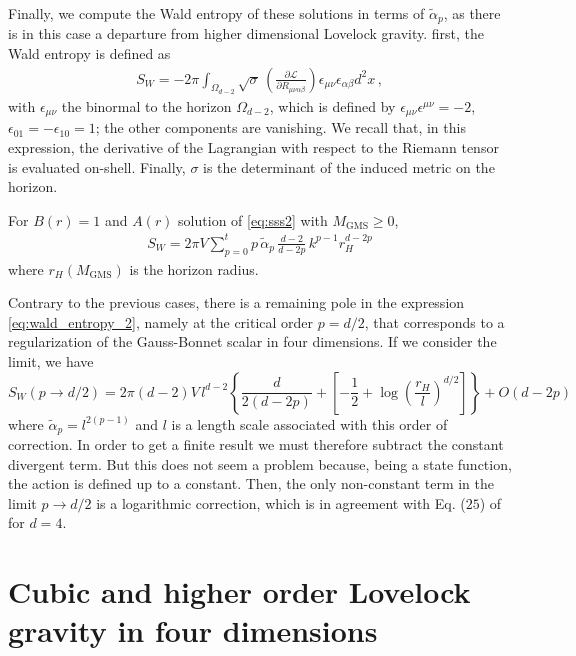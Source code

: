 \documentclass[aps,prd,preprint,nofootinbib]{revtex4-1}
\begin{document}
Finally, we compute the Wald entropy of these solutions in terms of $\tilde{\alpha}_p$, as there is in this case a departure from higher dimensional Lovelock gravity. first, the Wald entropy is defined as 
\begin{eqnarray}
 S_{W}=-2\pi \int_{\Omega_{d-2}} \sqrt{\sigma} \, \left( \frac{\partial \mathcal{L}}{\partial R_{\mu\nu\alpha\beta}} \right) \epsilon_{\mu\nu} \epsilon_{\alpha\beta} d^2 x \,,
\end{eqnarray}
with $\epsilon_{\mu\nu}$ the binormal to the horizon $\Omega_{d-2}$, which is defined by $\epsilon_{\mu\nu} \epsilon^{\mu\nu} =-2$, $\epsilon_{01}=-\epsilon_{10}=1$; the other components are vanishing. We recall that, in this expression, the derivative of the Lagrangian with respect to the Riemann tensor  is evaluated on-shell. Finally, $\sigma$ is the determinant of the induced metric on the horizon. 

For $B(r)=1$ and $A\left(r\right)$ solution of \eqref{eq:sss2} with $M_{\text{GMS}} \geq 0$,
\begin{eqnarray}
S_W=2 \pi V  \sum_{p=0}^t p \,  \tilde{\alpha}_p \, \frac{d-2}{d-2p} \, k^{p-1} r_H^{d-2p}\label{eq:wald_entropy_2}
\end{eqnarray}
where $r_H \left(M_{\text{GMS}} \right)$ is the horizon radius. 

Contrary to the previous cases, there is a remaining pole in the expression \eqref{eq:wald_entropy_2}, namely at the critical order $p=d/2$, that corresponds to a regularization of the Gauss-Bonnet scalar in four dimensions. If we consider the limit, we have 
\begin{equation}
S_W \left( p \to d/2 \right) =2\pi(d-2) V \, l^{d-2}  \left\lbrace \frac{d  }{2(d-2p)} +  \left[ -\frac{1}{2} + \log\left( \frac{r_H}{l} \right)^{d/2}  \right]    \right\rbrace + O\left(d-2p\right)
\end{equation}
where $\tilde{\alpha}_{p}=l^{2(p-1)}$ and $l$ is a length scale associated with this order of correction. In order to get a finite result we must therefore subtract the constant divergent term. But this does not seem a problem because, being a state function, the action is defined up to a constant. Then, the only non-constant term in the limit $p \to d/2$ is a logarithmic correction, which is in agreement with Eq. ($25$) of \cite{Cognola:2013fva} for $d=4$.

\section{Cubic and higher order Lovelock gravity in four dimensions}
\end{document}
